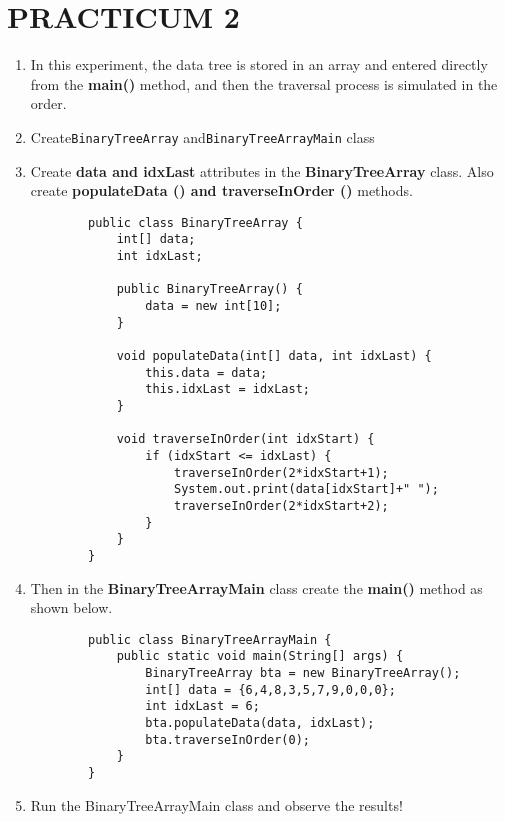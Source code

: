 \documentclass[12pt,titlepage]{article}
\begin{document}
\section{PRACTICUM 2}
\begin{enumerate}
    \item In this experiment, the data tree is stored in an array and entered directly from the \textbf{main()} method, and then the traversal process is simulated in the order.
    \item Create\texttt{BinaryTreeArray} and\texttt{BinaryTreeArrayMain} class
    \item Create \textbf{data and idxLast} attributes in the \textbf{BinaryTreeArray} class. Also create \textbf{populateData () and traverseInOrder ()} methods.
    \begin{verbatim}
        public class BinaryTreeArray {
            int[] data;
            int idxLast;

            public BinaryTreeArray() {
                data = new int[10];
            }

            void populateData(int[] data, int idxLast) {
                this.data = data;
                this.idxLast = idxLast;
            }

            void traverseInOrder(int idxStart) {
                if (idxStart <= idxLast) {
                    traverseInOrder(2*idxStart+1);
                    System.out.print(data[idxStart]+" ");
                    traverseInOrder(2*idxStart+2);
                }
            }
        }
    \end{verbatim}
    \item Then in the \textbf{BinaryTreeArrayMain} class create the \textbf{main()} method as shown below.
    \begin{verbatim}
        public class BinaryTreeArrayMain {
            public static void main(String[] args) {
                BinaryTreeArray bta = new BinaryTreeArray();
                int[] data = {6,4,8,3,5,7,9,0,0,0};
                int idxLast = 6;
                bta.populateData(data, idxLast);
                bta.traverseInOrder(0);
            }
        }
    \end{verbatim}
    \item Run the BinaryTreeArrayMain class and observe the results!
\end{enumerate}
\end{document}
